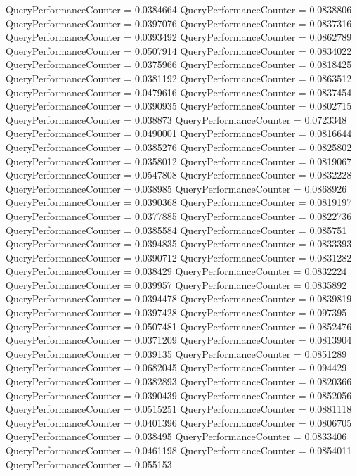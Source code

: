 \documentclass[9pt]{article}
\theoremstyle{plain}
\theoremstyle{definition}
\theoremstyle{remark}
\numberwithin{equation}{section}
\begin{document}
QueryPerformanceCounter  =  0.0384664
QueryPerformanceCounter  =  0.0838806
QueryPerformanceCounter  =  0.0397076
QueryPerformanceCounter  =  0.0837316
QueryPerformanceCounter  =  0.0393492
QueryPerformanceCounter  =  0.0862789
QueryPerformanceCounter  =  0.0507914
QueryPerformanceCounter  =  0.0834022
QueryPerformanceCounter  =  0.0375966
QueryPerformanceCounter  =  0.0818425
QueryPerformanceCounter  =  0.0381192
QueryPerformanceCounter  =  0.0863512
QueryPerformanceCounter  =  0.0479616
QueryPerformanceCounter  =  0.0837454
QueryPerformanceCounter  =  0.0390935
QueryPerformanceCounter  =  0.0802715
QueryPerformanceCounter  =  0.038873
QueryPerformanceCounter  =  0.0723348
QueryPerformanceCounter  =  0.0490001
QueryPerformanceCounter  =  0.0816644
QueryPerformanceCounter  =  0.0385276
QueryPerformanceCounter  =  0.0825802
QueryPerformanceCounter  =  0.0358012
QueryPerformanceCounter  =  0.0819067
QueryPerformanceCounter  =  0.0547808
QueryPerformanceCounter  =  0.0832228
QueryPerformanceCounter  =  0.038985
QueryPerformanceCounter  =  0.0868926
QueryPerformanceCounter  =  0.0390368
QueryPerformanceCounter  =  0.0819197
QueryPerformanceCounter  =  0.0377885
QueryPerformanceCounter  =  0.0822736
QueryPerformanceCounter  =  0.0385584
QueryPerformanceCounter  =  0.085751
QueryPerformanceCounter  =  0.0394835
QueryPerformanceCounter  =  0.0833393
QueryPerformanceCounter  =  0.0390712
QueryPerformanceCounter  =  0.0831282
QueryPerformanceCounter  =  0.038429
QueryPerformanceCounter  =  0.0832224
QueryPerformanceCounter  =  0.039957
QueryPerformanceCounter  =  0.0835892
QueryPerformanceCounter  =  0.0394478
QueryPerformanceCounter  =  0.0839819
QueryPerformanceCounter  =  0.0397428
QueryPerformanceCounter  =  0.097395
QueryPerformanceCounter  =  0.0507481
QueryPerformanceCounter  =  0.0852476
QueryPerformanceCounter  =  0.0371209
QueryPerformanceCounter  =  0.0813904
QueryPerformanceCounter  =  0.039135
QueryPerformanceCounter  =  0.0851289
QueryPerformanceCounter  =  0.0682045
QueryPerformanceCounter  =  0.094429
QueryPerformanceCounter  =  0.0382893
QueryPerformanceCounter  =  0.0820366
QueryPerformanceCounter  =  0.0390439
QueryPerformanceCounter  =  0.0852056
QueryPerformanceCounter  =  0.0515251
QueryPerformanceCounter  =  0.0881118
QueryPerformanceCounter  =  0.0401396
QueryPerformanceCounter  =  0.0806705
QueryPerformanceCounter  =  0.038495
QueryPerformanceCounter  =  0.0833406
QueryPerformanceCounter  =  0.0461198
QueryPerformanceCounter  =  0.0854011
QueryPerformanceCounter  =  0.055153
\end{document}
